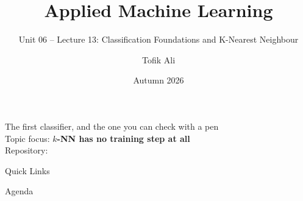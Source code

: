 \documentclass[aspectratio=169]{beamer}
\title[Applied Machine Learning]{Applied Machine Learning}
\subtitle{Unit 06 -- Lecture 13: Classification Foundations and
          K-Nearest Neighbour}
\author{Tofik Ali}
\institute{School of Computer Science, UPES Dehradun}
\date{Autumn 2026}
\begin{document}
\UPESCoverFrame
\setcounter{framenumber}{0}

\begin{frame}
  \titlepage
  \begin{center}
    \footnotesize The first classifier, and the one you can check with a
    pen\\[0.25em]
    \footnotesize Topic focus: \textbf{$k$-NN has no training step at
    all}\\[0.25em]
    \footnotesize Repository: \texttt{\AMLRepoURL}
  \end{center}
  \slidesources{\AMLUnitVISources}
\end{frame}

\begin{frame}{Quick Links}
  \centering
  \hyperlink{sec:setting}{}\hspace{0.4em}
  \hyperlink{sec:lazy}{}\hspace{0.4em}
  \hyperlink{sec:knn}{}\hspace{0.4em}
  \hyperlink{sec:k}{}\hspace{0.4em}
  \hyperlink{sec:scale}{}\hspace{0.4em}
  \hyperlink{sec:metric}{}\hspace{0.4em}
  \hyperlink{sec:curse}{}\hspace{0.4em}
  \hyperlink{sec:practical}{}\hspace{0.4em}
  \hyperlink{sec:summary}{}
\end{frame}

\begin{frame}{Agenda}
  \tableofcontents
\end{frame}
\end{document}

